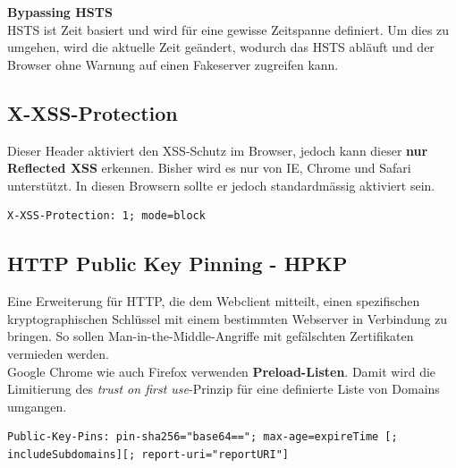 \textbf{Bypassing HSTS}\\
HSTS ist Zeit basiert und wird für eine gewisse Zeitspanne definiert. Um dies zu umgehen, wird die aktuelle Zeit geändert, wodurch das HSTS abläuft und der Browser ohne Warnung auf einen Fakeserver zugreifen kann.

\subsection{X-XSS-Protection}
Dieser Header aktiviert den XSS-Schutz im Browser, jedoch kann dieser \textbf{nur Reflected XSS} erkennen. Bisher wird es nur von IE, Chrome und Safari unterstützt. In diesen Browsern sollte er jedoch standardmässig aktiviert sein.

\begin{lstlisting}[language={},caption=Beispiel des X-XSS-Protection Headers]
X-XSS-Protection: 1; mode=block
\end{lstlisting}

\subsection{HTTP Public Key Pinning - HPKP}
Eine Erweiterung für HTTP, die dem Webclient mitteilt, einen spezifischen kryptographischen Schlüssel mit einem bestimmten Webserver in Verbindung zu bringen. So sollen Man-in-the-Middle-Angriffe mit gefälschten Zertifikaten vermieden werden.\\

Google Chrome wie auch Firefox verwenden \textbf{Preload-Listen}. Damit wird die Limitierung des \textit{trust on first use}-Prinzip für eine definierte Liste von Domains umgangen.

\begin{lstlisting}[language={},caption=Beispiel des HPKP-Headers]
Public-Key-Pins: pin-sha256="base64=="; max-age=expireTime [; includeSubdomains][; report-uri="reportURI"]
\end{lstlisting}